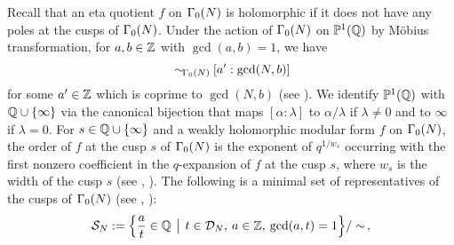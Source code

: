 \documentclass[a4paper,11pt]{amsart}
\begin{document}
Recall that an eta quotient $f$ on $\Gamma_0(N)$ is holomorphic
if it 
does not have any poles at the cusps of $\Gamma_0(N)$. Under the action of $\Gamma_0(N)$ on $\mathbb{P}^1(\mathbb{Q})$
by M\"obius transformation, for 
$a,b\in\mathbb{Z}$ with $\gcd(a,b)=1$,
we have
\begin{equation}
[a:b]\hspace{.1cm}
{{{{\sim}}}}_{\hspace*{-.05cm}{{{{\GN}}}}}
\hspace{.08cm}[a':\gcd(N,b)]\label{19.05.2015} 
\end{equation}
for some $a'\in\mathbb{Z}$ which is coprime to $\gcd(N,b)$ (see \cite{ds}).
We identify $\mathbb{P}^1(\mathbb{Q})$ with $\mathbb{Q}\cup\{\infty\}$ via the canonical bijection that maps $[\alpha:\lambda]$ to 
$\alpha/\lambda$ if $\lambda\neq0$ and to $\infty$ if $\lambda=0$. 
For $s\in\mathbb{Q}\cup\{\infty\}$ and a weakly holomorphic modular form $f$ on $\Gamma_0(N)$, the order of $f$ at the cusp $s$ of $\Gamma_0(N)$ is %
the exponent of 
 \hyperlink{queue}{$q^{{1}/{w_s}}$} %
occurring with the first nonzero coefficient in the %
$q$-expansion of $f$
at the cusp $s$,
where $w_s$ is the width of the cusp $s$ (see \cite{ds}, \cite{ra}).
The following is a minimal set of representatives of the cusps of $\Gamma_0(N)$ (see \cite{ds}, \cite{ymart}):
\begin{equation}
\mathcal{S}_N:=\Big{\{}\frac{a}{t}\in\mathbb{Q}\hspace{2.5pt}{\hspace{1.5pt} \big|\hspace{1.5pt}}\hspace{2.5pt}t\in\mathcal{D}_N,\hspace{2pt} a\in\mathbb{Z}, 
 \hspace{2pt}\gcd(a,t)=1\Big{\}}/\sim\hspace{1.5pt},
\end{equation}
\end{document}
